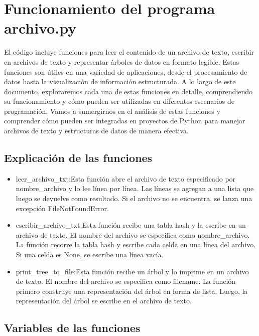 \section{Funcionamiento del programa archivo.py}
\begin{minipage}{\textwidth}
  El código incluye funciones para leer el contenido de un archivo de texto, escribir en archivos de texto y representar árboles de datos en formato legible. Estas funciones son útiles en una variedad de aplicaciones, desde el procesamiento de datos hasta la visualización de información estructurada.\newline
  A lo largo de este documento, exploraremos cada una de estas funciones en detalle, comprendiendo su funcionamiento y cómo pueden ser utilizadas en diferentes escenarios de programación.\newline
  Vamos a sumergirnos en el análisis de estas funciones y comprender cómo pueden ser integradas en proyectos de Python para manejar archivos de texto y estructuras de datos de manera efectiva.
\end{minipage} 
\subsection{Explicación de las funciones}
\begin{itemize}
  \item leer\_archivo\_txt:\newline Esta función abre el archivo de texto especificado por nombre\_archivo y lo lee línea por línea. Las líneas se agregan a una lista que luego se devuelve como resultado. Si el archivo no se encuentra, se lanza una excepción FileNotFoundError.
  \item escribir\_archivo\_txt:\newline Esta función recibe una tabla hash y la escribe en un archivo de texto. El nombre del archivo se especifica como nombre\_archivo. La función recorre la tabla hash y escribe cada celda en una línea del archivo. Si una celda es None, se escribe una línea vacía.
  \item print\_tree\_to\_file:\newline Esta función recibe un árbol y lo imprime en un archivo de texto. El nombre del archivo se especifica como filename. La función primero construye una representación del árbol en forma de lista. Luego, la representación del árbol se escribe en el archivo de texto.
\end{itemize}
\subsection{Variables de las funciones}

